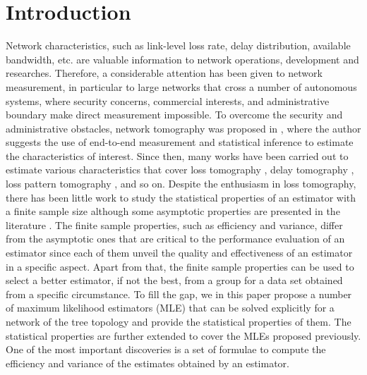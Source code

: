 \documentclass[10pt,onecolumn]{IEEEtran}
\begin{document}
\section{Introduction}
\label{section1}
Network characteristics, such as link-level loss rate, delay distribution, available
bandwidth, etc. are valuable information to network
operations, development and researches. Therefore,
 a considerable attention has been given to network
measurement, in particular to  large networks that cross a number of autonomous systems, where security concerns, commercial interests, and administrative
boundary make direct measurement impossible. To overcome the security and administrative obstacles, network tomography was
proposed in \cite{YV96}, where the author suggests the use of
end-to-end measurement and statistical inference to estimate the characteristics of interest.
Since then,
many works have been carried  out to estimate various characteristics that cover loss tomography \cite{CDHT99, CDMT99, CDMT99a, CN00, XGN06, BDPT02,ADV07, DHPT06, ZG05, GW03}, delay tomography
\cite{LY03,TCN03,PDHT02, SH03, LGN06},
 loss pattern tomography \cite{ADV07}, and so on. Despite the enthusiasm  in loss tomography, there has been little work to study the statistical properties of an estimator with a finite sample size although some asymptotic properties are presented in the literature \cite{CDHT99, DHPT06}.  The  finite sample properties, such as efficiency and variance,  differ from  the asymptotic ones that are critical to the performance evaluation of  an estimator since each of them unveil the quality and effectiveness of an estimator in a specific aspect.  Apart from that, the finite sample properties can be used to select a better estimator, if not the best,  from a group for a data set obtained from a specific circumstance. To fill the gap, we in this paper propose a number of maximum likelihood estimators (MLE) that can be solved explicitly for a network of the tree topology and provide  the statistical properties of them. The statistical properties are further extended to cover the MLEs proposed previously. One of the most important discoveries is a set of formulae to compute the efficiency and variance of the estimates obtained by an estimator.
\end{document}
